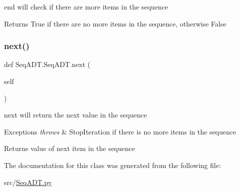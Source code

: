 end will check if there are more items in the sequence 

\begin{DoxyReturn}{Returns}
True if there are no more items in the sequence, otherwise False 
\end{DoxyReturn}
\mbox{\label{class_seq_a_d_t_1_1_seq_a_d_t_a1d2ee97ccd784507ae32c00150dc6fb0}} 
\subsubsection{\texorpdfstring{next()}{next()}}
{\footnotesize\ttfamily def Seq\+A\+D\+T.\+Seq\+A\+D\+T.\+next (\begin{DoxyParamCaption}\item[{}]{self }\end{DoxyParamCaption})}



next will return the next value in the sequence 


\begin{DoxyExceptions}{Exceptions}
{\em throws} & Stop\+Iteration if there is no more items in the sequence \\
\hline
\end{DoxyExceptions}
\begin{DoxyReturn}{Returns}
value of next item in the sequence 
\end{DoxyReturn}


The documentation for this class was generated from the following file\+:\begin{DoxyCompactItemize}
\item 
src/\hyperlink{_seq_a_d_t_8py}{Seq\+A\+D\+T.\+py}\end{DoxyCompactItemize}

